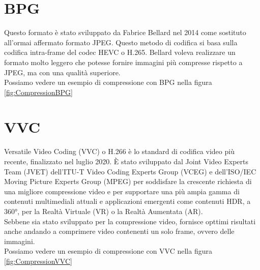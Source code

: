 \section{BPG}
Questo formato è stato sviluppato da Fabrice Bellard nel 2014 come sostituto all’ormai affermato formato JPEG. Questo metodo di codifica si basa sulla codifica intra-frame del codec HEVC o H.265. \cite{BPGImageformat} Bellard voleva realizzare un formato molto leggero che potesse fornire immagini più compresse rispetto a JPEG, ma con una qualità superiore.\\
Possiamo vedere un esempio di compressione con BPG nella figura \ref*{fig:CompressionBPG}

\section{VVC}
Versatile Video Coding (VVC) o H.266 è lo standard di codifica video più recente, finalizzato nel luglio 2020. È stato sviluppato dal Joint Video Experts Team (JVET) dell'ITU-T Video Coding Experts Group (VCEG) e dell'ISO/IEC Moving Picture Experts Group (MPEG) per soddisfare la crescente richiesta di una migliore compressione video e per supportare una più ampia gamma di contenuti multimediali attuali e applicazioni emergenti come contenuti HDR, a 360°, per la Realtà Virtuale (VR) o la Realtà Aumentata (AR).\cite{9503377}\\
Sebbene sia stato sviluppato per la compressione video, fornisce opttimi risultati anche andando a comprimere video contenenti un solo frame, ovvero delle immagini.\\
Possiamo vedere un esempio di compressione con VVC nella figura \ref*{fig:CompressionVVC}


